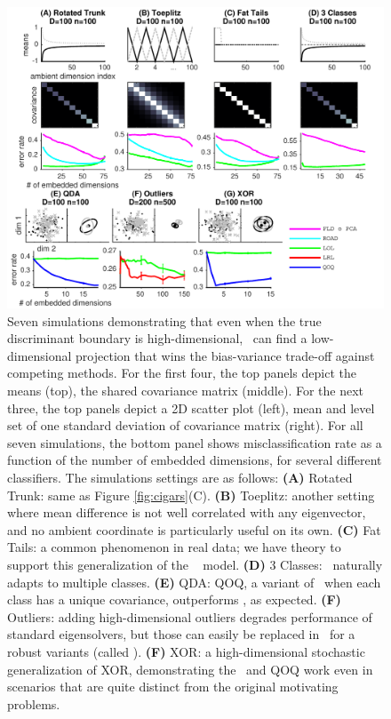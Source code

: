 \documentclass[10pt]{article}
\begin{document}
\begin{figure}[h!]
\centering
\includegraphics[width=1\linewidth]{../Figs/properties}
\caption{
Seven simulations demonstrating that even when the true discriminant boundary is high-dimensional, \Lol~can find a low-dimensional projection that wins the bias-variance trade-off against competing methods.  
For the first four, the top panels depict the means (top), the shared covariance matrix (middle).  For the next three, the top panels depict a 2D scatter plot (left), mean and level set of one standard deviation of covariance matrix (right).  For all seven simulations, the bottom panel shows misclassification rate as a function of the number of embedded dimensions, for several different classifiers.  The simulations settings are as follows:
\textbf{(A)} Rotated Trunk: same as Figure \ref{fig:cigars}(C).
\textbf{(B)} Toeplitz: another setting where mean difference is not well correlated with any eigenvector, and no ambient coordinate is particularly useful on its own.
\textbf{(C)} Fat Tails: a common phenomenon in real data; we have theory to support this generalization of the \Lda~ model.
\textbf{(D)} 3 Classes: \Lol~naturally adapts to multiple classes.
\textbf{(E)} QDA: QOQ, a variant of \Lol~when each class has a unique covariance, outperforms \Lol, as expected.
\textbf{(F)} Outliers: adding high-dimensional outliers degrades performance of standard eigensolvers, but those can easily be replaced in \Lol~for a robust variants (called \Lrl).
\textbf{(F)} XOR: a high-dimensional stochastic generalization of XOR, demonstrating the \Lol~and QOQ work even in scenarios that are quite distinct from the original motivating problems.
}
\end{figure}
\end{document}
